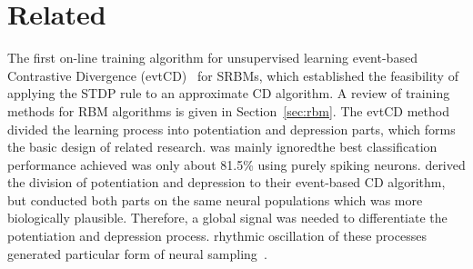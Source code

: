 \section{Related \DIFdelbegin {}\DIFdelend \DIFaddbegin {}\DIFaddend }
\label{sec:SRM_related}
\DIFdelbegin {}\DIFdelend %
The first on-line training algorithm for unsupervised learning \DIFdelbegin {}\DIFdelend \DIFaddbegin {}\DIFaddend event-based Contrastive Divergence (evtCD)~\citep{neil2013online} for SRBMs, which established the feasibility of applying the STDP rule to an approximate CD algorithm.
A review of training methods for RBM algorithms is given in Section~\ref{sec:rbm}.
The evtCD method divided the learning process into potentiation and depression parts, which forms the basic design of related research.
\DIFdelbegin {}\DIFdelend \DIFaddbegin {}\DIFaddend was mainly ignored\DIFdelbegin {}\DIFdelend \DIFaddbegin {}\DIFaddend the best classification performance achieved was only about 81.5\% \DIFaddbegin {}\DIFaddend using purely spiking neurons.
\DIFdelbegin {}\DIFdelend \DIFaddbegin {}\DIFaddend derived the division of potentiation and depression to their event-based CD algorithm, but conducted both parts on the same neural populations which was more biologically plausible.
Therefore, a global signal was needed to differentiate the potentiation and depression process.
\DIFdelbegin {}\DIFdelend \DIFaddbegin {}\DIFaddend rhythmic oscillation of these processes generated \DIFdelbegin {}\DIFdelend \DIFaddbegin {}\DIFaddend particular form of neural sampling~\citep{petrovici2013stochastic}.

